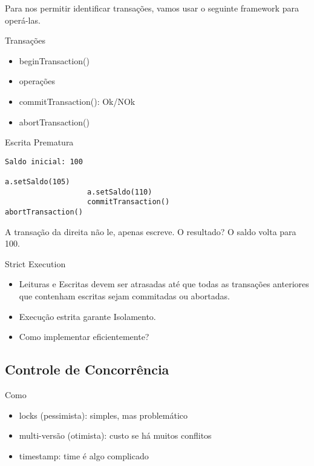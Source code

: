 Para nos permitir identificar transações, vamos usar o seguinte framework para operá-las.
\begin{frame}{Transações}
\begin{itemize}
	\item beginTransaction()
	\item operações
	\item commitTransaction(): Ok/NOk
	\item abortTransaction()
\end{itemize}
\end{frame}



\begin{frame}[fragile]{Escrita Prematura}
\begin{verbatim}
Saldo inicial: 100

a.setSaldo(105)
                   a.setSaldo(110)  
                   commitTransaction()
abortTransaction()
\end{verbatim}

A transação da direita não le, apenas escreve. O resultado?  O saldo volta para 100.
\end{frame}


\begin{frame}{Strict Execution}
\begin{itemize}
	\item Leituras e Escritas devem ser atrasadas até que todas as transações anteriores que contenham escritas sejam commitadas ou abortadas.
	\item Execução estrita garante Isolamento.
	\item Como implementar eficientemente?
\end{itemize}
\end{frame}


\subsection{Controle de Concorrência}

\begin{frame}{Como}
\begin{itemize}
	\item locks (pessimista): simples, mas problemático
	\item multi-versão (otimista): custo se há muitos conflitos
	\item timestamp: \alert{time} é algo complicado
\end{itemize}
\end{frame}

